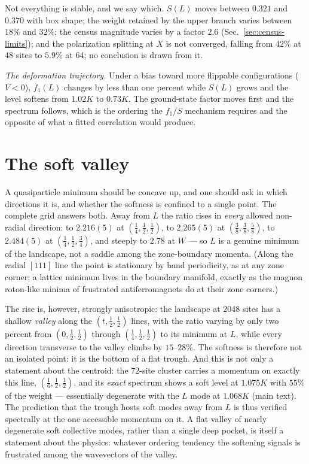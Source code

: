 \documentclass[aps,prl,twocolumn,amsmath,amssymb,superscriptaddress,
longbibliography,floatfix]{revtex4-2}
\begin{document}
Not everything is stable, and we say which. $S(L)$ moves between
$0.321$ and $0.370$ with box shape; the weight retained by the upper
branch varies between $18\%$ and $32\%$; the census magnitude varies
by a factor $2.6$ (Sec.~\ref{sec:census-limits}); and the polarization
splitting at $X$ is not converged, falling from $42\%$ at 48 sites to
$5.9\%$ at 64; no conclusion is drawn from it.

\emph{The deformation trajectory.} Under a bias toward more flippable
configurations ($V<0$), $f_1(L)$ changes by less than one percent
while $S(L)$ grows and the level softens from $1.02K$ to $0.73K$. The
ground-state factor moves first and the spectrum follows, which is the
ordering the $f_1/S$ mechanism requires and the opposite of what a
fitted correlation would produce.



\section{The soft valley}
\label{sm:valley}

A quasiparticle minimum should be concave up, and one should ask in
which directions it is, and whether the softness is confined to a
single point. The complete grid answers both. Away from $L$ the ratio
rises in \emph{every} allowed non-radial direction: to $2.216(5)$ at
$(\frac14,\frac12,\frac12)$, to $2.265(5)$ at
$(\frac38,\frac38,\frac58)$, to $2.484(5)$ at
$(\frac14,\frac12,\frac34)$, and steeply to $2.78$ at $W$ --- so $L$
is a genuine minimum of the landscape, not a saddle among the
zone-boundary momenta. (Along the radial $[111]$ line the point is
stationary by band periodicity, as at any zone corner; a lattice
minimum lives in the boundary manifold, exactly as the magnon
roton-like minima of frustrated antiferromagnets do at their zone
corners.)

The rise is, however, strongly anisotropic: the landscape at 2048
sites has a shallow \emph{valley} along the $(t,\frac12,\frac12)$
lines, with the ratio varying by only two percent from
$(0,\frac12,\frac12)$ through $(\frac14,\frac12,\frac12)$ to its
minimum at $L$, while every direction transverse to the valley climbs
by $15$--$28\%$. The softness is therefore not an isolated point: it
is the bottom of a flat trough. And this is not only a statement
about the centroid: the 72-site cluster carries a momentum on exactly
this line, $(\frac16,\frac12,\frac12)$, and its \emph{exact} spectrum
shows a soft level at $1.075K$ with $55\%$ of the weight ---
essentially degenerate with the $L$ mode at $1.068K$
(main text). The prediction that the trough hosts
soft modes away from $L$ is thus verified spectrally at the one
accessible momentum on it. A flat valley of nearly degenerate soft
collective modes, rather than a single deep pocket, is itself a
statement about the physics: whatever ordering tendency the softening
signals is frustrated among the wavevectors of the valley.
\end{document}
